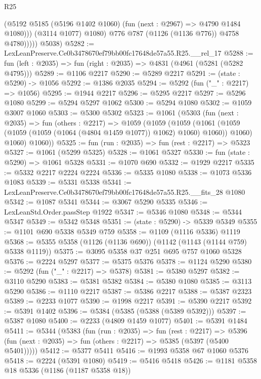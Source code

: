 \begin{lexlean}{R25}
\begin{coremodule}
                    (@5192 @5185 (@5196 @1402 @1060) (fun (next : @2967) => @4790 @1484 @1080)))
                  (@3114 @1077)
                  @1080)
                @776
                @787
                (@1126 (@1136 @776))
                @4758
                @4780)))))
      @5038)
@5282 := LexLeanPreserve.Ce0b3478670ef79bb00fc17648de57a55.R25.__rel_17
@5288 := fun (left : @2035) => fun (right : @2035) => @4831 (@4961 (@5281 (@5282 @4795)))
@5289 := @1106 @2217
@5290 := @5289 @2217
@5291 := (state : @5290) -> @1056
@5292 := @1386 @2035
@5294 := @5292 (fun ("_" : @2217) => @1056)
@5295 := @1944 @2217
@5296 := @5295 @2217
@5297 := @5296 @1080
@5299 := @5294 @5297 @1062
@5300 := @5294 @1080
@5302 := @1059 @3007 @1060
@5303 := @5300 @5302
@5323 := @1061
    (@5303
      (fun (next : @2035) =>
      fun (others : @2217) =>
      @1059
        (@1059
          (@1059
            (@1061 (@1059 (@1059 (@1059 (@1064 (@4804 @1459 @1077)) @1062) @1060) @1060))
            @1060)
          @1060)
        @1060))
@5325 := fun (run : @2035) => fun (rest : @2217) => @5323
@5327 := @1061 (@5299 @5325)
@5328 := @1061 @5327
@5330 := fun (state : @5290) => @1061 @5328
@5331 := @1070 @690
@5332 := @1929 @2217
@5335 := @5332 @2217 @2224 @2224
@5336 := @5335 @1080
@5338 := @1073 @5336 @1083
@5339 := @5331 @5338
@5341 := LexLeanPreserve.Ce0b3478670ef79bb00fc17648de57a55.R25.__fits_28 @1080
@5342 := @1087 @5341
@5344 := @3067 @5290 @5335
@5346 := LexLeanStd.Order.passStep @1922
@5347 := @5346 @1080
@5348 := @5344 @5347
@5349 := @5342 @5348
@5351 := (state : @5290) -> @5339 @5349
@5355 := @1101 @690 @5338 @5349 @759
@5358 := @1109 (@1116 @5336) @1119
@5368 := @5355 @5358 (@1126 (@1136 @690)) (@1142 (@1143 (@1144 @759) @5338 @1119))
@5375 := @3095 @5358 @37 @251 @695 @757 @1060 @5328
@5376 := @2224 @5297
@5377 := @5375 @5376
@5378 := @1124 @5290
@5380 := @5292 (fun ("_" : @2217) => @5378)
@5381 := @5380 @5297
@5382 := @3110 @5290
@5383 := @5381 @5382
@5384 := @5380 @1080
@5385 := @3113 @5290
@5386 := @1110 @2217
@5387 := @5386 @2217
@5388 := @5387 @2323
@5389 := @2233 @1077
@5390 := @1998 @2217
@5391 := @5390 @2217
@5392 := @5391 @1402
@5396 := @5384 (@5385 (@5388 (@5389 @5392)))
@5397 := @5387 @1080
@5400 := @2233 (@4809 @1459 @1077)
@5401 := @5391 @1484
@5411 := @5344
    (@5383
      (fun (run : @2035) =>
      fun (rest : @2217) =>
      @5396 (fun (next : @2035) => fun (others : @2217) => @5385 (@5397 (@5400 @5401)))))
@5412 := @5377 @5411
@5416 := @1993 @5358 @67 @1060 @5376
@5418 := @2224 (@5391 @1080)
@5419 := @5416 @5418
@5426 := @1181 @5358 @18 @5336 (@1186 (@1187 @5358 @18))

\end{coremodule}
\end{lexlean}
